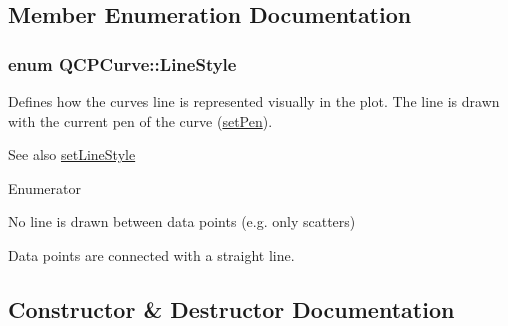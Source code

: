 \subsection{Member Enumeration Documentation}
\hypertarget{classQCPCurve_a2710e9f79302152cff794c6e16cc01f1}{}
\subsubsection[{Line\+Style}]{\setlength{\rightskip}{0pt plus 5cm}enum {\bf Q\+C\+P\+Curve\+::\+Line\+Style}}\label{classQCPCurve_a2710e9f79302152cff794c6e16cc01f1}
Defines how the curve\textquotesingle{}s line is represented visually in the plot. The line is drawn with the current pen of the curve (\hyperlink{classQCPAbstractPlottable_ab74b09ae4c0e7e13142fe4b5bf46cac7}{set\+Pen}). \begin{DoxySeeAlso}{See also}
\hyperlink{classQCPCurve_a4a377ec863ff81a1875c3094a6177c19}{set\+Line\+Style} 
\end{DoxySeeAlso}
\begin{Desc}
\item[Enumerator]\par
\begin{description}
\item[{\em 
\hypertarget{classQCPCurve_a2710e9f79302152cff794c6e16cc01f1aec1601a191cdf0b4e761c4c66092cc48}{}ls\+None\label{classQCPCurve_a2710e9f79302152cff794c6e16cc01f1aec1601a191cdf0b4e761c4c66092cc48}
}]No line is drawn between data points (e.\+g. only scatters) \item[{\em 
\hypertarget{classQCPCurve_a2710e9f79302152cff794c6e16cc01f1ade5822ce6fbf131d3df131795c2e1003}{}ls\+Line\label{classQCPCurve_a2710e9f79302152cff794c6e16cc01f1ade5822ce6fbf131d3df131795c2e1003}
}]Data points are connected with a straight line. \end{description}
\end{Desc}


\subsection{Constructor \& Destructor Documentation}
\hypertarget{classQCPCurve_a36de58e2652b3fa47bdf9187d421d3ce}{}
